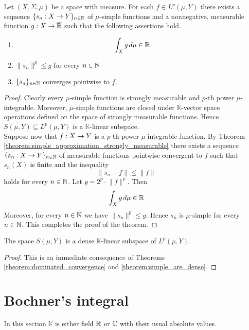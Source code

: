 \begin{theorem}\label{theorem:simple_are_dense}
    Let $(X,\Sigma, \mu)$ be a space with measure. For each $f \in L^p(\mu,Y)$ there exists a sequence $\{s_n:X\rightarrow Y\}_{n\in {\mathbb N}}$ of $\mu$-simple functions and a nonnegative, measurable function $g:X\rightarrow \overline{{\mathbb R}}$ such that the following assertions hold.
    \begin{enumerate}[label=\emph{\textbf{(\arabic*)}}, leftmargin=*]
        \item
              $$\int_Xg\,d\mu \in {\mathbb R}$$
        \item $\lVert s_n \rVert^p \leq g$ for every $n\in {\mathbb N}$
        \item $\{s_n\}_{n\in {\mathbb N}}$ converges pointwise to $f$.
    \end{enumerate}
\end{theorem}
\begin{proof}
    Clearly every $\mu$-simple function is strongly measurable and $p$-th power $\mu$-integrable. Moreover, $\mu$-simple functions are closed under $\mathbb{K}$-vector space operations defined on the space of strongly measurable functions. Hence $S(\mu, Y) \subseteq L^p(\mu, Y)$ is a $\mathbb{K}$-linear subspace.\\
    Suppose now that $f:X\rightarrow Y$ is a $p$-th power $\mu$-integrable function. By Theorem \ref{theorem:simple_approximation_strongly_measurable} there exists a sequence $\{s_n:X\rightarrow Y\}_{n\in {\mathbb N}}$ of measurable functions pointwise convergent to $f$ such that $s_n(X)$ is finite and the inequality
    $$\lVert s_n - f\rVert\leq \lVert f\rVert$$
    holds for every $n\in {\mathbb N}$. Let $g = 2^p \cdot \lVert f\rVert^p$. Then
    $$\int_Xg\,d\mu \in {\mathbb R}$$
    Moreover, for every $n\in {\mathbb N}$ we have $\lVert s_n \rVert^p \leq g$. Hence $s_n$ is $\mu$-simple for every $n\in {\mathbb N}$. This completes the proof of the  theorem.
\end{proof}

\begin{corollary}\label{corollary:simple_are_dense}
    The space $S(\mu, Y)$ is a dense $\mathbb{K}$-linear subspace of $L^p(\mu, Y)$.
\end{corollary}
\begin{proof}
    This is an immediate consequence of Theorems \ref{theorem:dominated_convergence} and \ref{theorem:simple_are_dense}.
\end{proof}

\section{Bochner's integral}\label{section:bochner_integration}
\noindent
In this section $\mathbb{K}$ is either field ${\mathbb R}$ or ${\mathbb C}$ with their usual absolute values.

